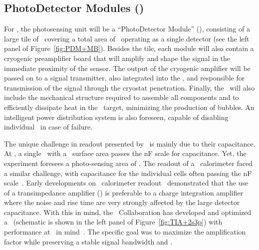 \subsection{PhotoDetector Modules (\DSkPdm)}

For \DSks, the photosensing unit will be a ``PhotoDetector Module'' (\DSkPdm), consisting of a large tile of \SiPMs\ covering a total area of \DSkTileAreaStd\ operating as a single detector (see the left panel of Figure~\ref{fig:PDM+MB}).  Besides the tile, each module will also contain a cryogenic preamplifier board that will amplify and shape the signal in the immediate proximity of the sensor.  The output of the cryogenic amplifier will be passed on to a signal transmitter, also integrated into the \DSkPdm, and responsible for transmission of the signal through the cryostat penetration.  Finally, the \DSkPdm\ will also include the mechanical structure required to assemble all components and to efficiently dissipate heat in the \LAr\ target, minimizing the production of bubbles. An intelligent power distribution system is also foreseen, capable of disabling individual \DSkPdms\ in case of failure.

The unique challenge in readout presented by \SiPMs\ is mainly due to their capacitance. At \DSkSiPMCapacitancePerArea, a single \SiPM\ with a \DSkSiPMAreaStd\ surface area passes the \si{\nano\farad} scale for capacitance.  Yet, the experiment foresees a photo-sensing area of \DSkTilesArea.  The readout of a \LAr\ calorimeter faced a similar challenge, with capacitance for the individual cells often passing the \si{\nano\farad} scale~\cite{Willis:1974do}.  Early developments on \LAr\ calorimeter readout~\cite{Radeka:1974ca,Radeka:1988ku,Chase:1993dj,Chase:1997fk} demonstrated that the use of a transimpedance amplifier (\TIA) is preferable to a charge integration amplifier where the noise and rise time are very strongly affected by the large detector capacitance.  With this in mind, the \DS\ Collaboration has developed and optimized a \TIA\ (schematic is shown in the left panel of Figure~\ref{fig:TIA+2s3p}) with performance at \LArNormalTemperature\ in mind~\cite{DIncecco:2018fx}.  The specific goal was to maximize the amplification factor while preserving a stable signal bandwidth and \SNR.

